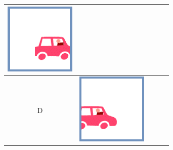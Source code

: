 \documentclass[12pt]{article}
\begin{document}
\begin{minipage}{\textwidth}
\begin{table}[H]
\begin{tabulary}{\linewidth}{|C|CCCC|}
				\vspace{0.01cm}\includegraphics[width=\linewidth]{option4}
				\\ \hline
				D &
				\vspace{0.01cm}\includegraphics[width=\linewidth]{option1} &

\end{tabulary}
\end{table}
\end{minipage}
\end{document}
